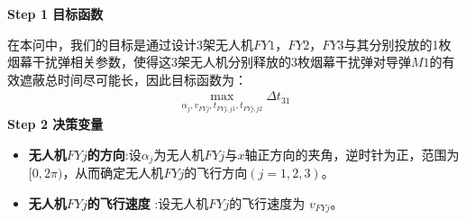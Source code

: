 \documentclass[../main.tex]{subfiles}
\begin{document}
\noindent \textbf{Step 1 目标函数}
\par 在本问中，我们的目标是通过设计3架无人机$FY1$，$FY2$，$FY3$与其分别投放的1枚烟幕干扰弹相关参数，使得这3架无人机分别释放的3枚烟幕干扰弹对导弹$M1$的有效遮蔽总时间尽可能长，因此目标函数为：
\begin{align}\label{19.1}
  \underset{\alpha_j ,v_{FYj},t_{FYj,j1},t_{FYj,j2}}{\max}\Delta t_{31}
\end{align}
\noindent \textbf{Step 2 决策变量}

\begin{itemize}
\item \textbf{无人机$FYj$的方向}:设$\alpha_j$为无人机$FYj$与$x$轴正方向的夹角，逆时针为正，范围为$[ 0,2\pi ) $，从而确定无人机$FYj$的飞行方向$(j=1,2,3)$。
\item  \textbf{无人机$FYj$的飞行速度} :设无人机$FYj$的飞行速度为 \( v_{FYj} \)。


\end{itemize}
\end{document}
